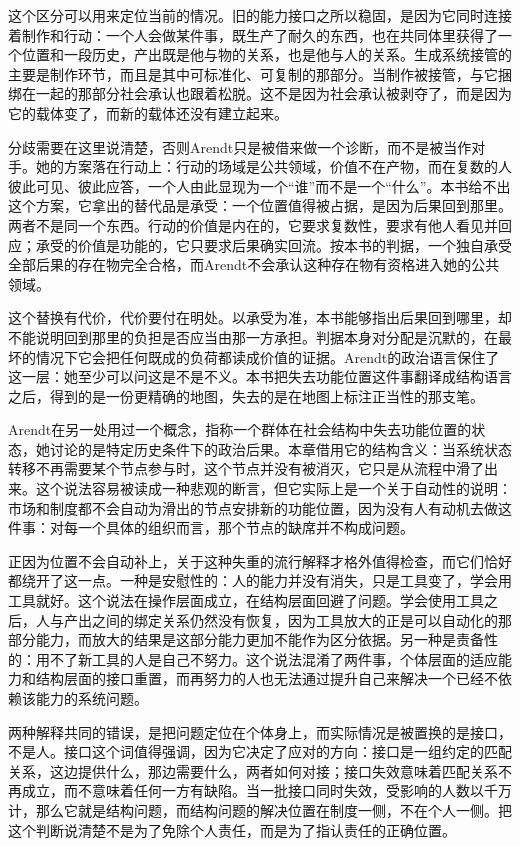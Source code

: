 这个区分可以用来定位当前的情况。旧的能力接口之所以稳固，是因为它同时连接着制作和行动：一个人会做某件事，既生产了耐久的东西，也在共同体里获得了一个位置和一段历史，产出既是他与物的关系，也是他与人的关系。生成系统接管的主要是制作环节，而且是其中可标准化、可复制的那部分。当制作被接管，与它捆绑在一起的那部分社会承认也跟着松脱。这不是因为社会承认被剥夺了，而是因为它的载体变了，而新的载体还没有建立起来。

分歧需要在这里说清楚，否则Arendt只是被借来做一个诊断，而不是被当作对手。她的方案落在行动上：行动的场域是公共领域，价值不在产物，而在复数的人彼此可见、彼此应答，一个人由此显现为一个“谁”而不是一个“什么”\cite{arendt1958human}。本书给不出这个方案，它拿出的替代品是承受：一个位置值得被占据，是因为后果回到那里。两者不是同一个东西。行动的价值是内在的，它要求复数性，要求有他人看见并回应；承受的价值是功能的，它只要求后果确实回流。按本书的判据，一个独自承受全部后果的存在物完全合格，而Arendt不会承认这种存在物有资格进入她的公共领域。

这个替换有代价，代价要付在明处。以承受为准，本书能够指出后果回到哪里，却不能说明回到那里的负担是否应当由那一方承担。判据本身对分配是沉默的，在最坏的情况下它会把任何既成的负荷都读成价值的证据。Arendt的政治语言保住了这一层：她至少可以问这是不是不义。本书把失去功能位置这件事翻译成结构语言之后，得到的是一份更精确的地图，失去的是在地图上标注正当性的那支笔。

Arendt在另一处用过一个概念，指称一个群体在社会结构中失去功能位置的状态，她讨论的是特定历史条件下的政治后果。本章借用它的结构含义：当系统状态转移不再需要某个节点参与时，这个节点并没有被消灭，它只是从流程中滑了出来。这个说法容易被读成一种悲观的断言，但它实际上是一个关于自动性的说明：市场和制度都不会自动为滑出的节点安排新的功能位置，因为没有人有动机去做这件事：对每一个具体的组织而言，那个节点的缺席并不构成问题。


正因为位置不会自动补上，关于这种失重的流行解释才格外值得检查，而它们恰好都绕开了这一点。一种是安慰性的：人的能力并没有消失，只是工具变了，学会用工具就好。这个说法在操作层面成立，在结构层面回避了问题。学会使用工具之后，人与产出之间的绑定关系仍然没有恢复，因为工具放大的正是可以自动化的那部分能力，而放大的结果是这部分能力更加不能作为区分依据。另一种是责备性的：用不了新工具的人是自己不努力。这个说法混淆了两件事，个体层面的适应能力和结构层面的接口重置，而再努力的人也无法通过提升自己来解决一个已经不依赖该能力的系统问题。

两种解释共同的错误，是把问题定位在个体身上，而实际情况是被置换的是接口，不是人。接口这个词值得强调，因为它决定了应对的方向：接口是一组约定的匹配关系，这边提供什么，那边需要什么，两者如何对接；接口失效意味着匹配关系不再成立，而不意味着任何一方有缺陷。当一批接口同时失效，受影响的人数以千万计，那么它就是结构问题，而结构问题的解决位置在制度一侧，不在个人一侧。把这个判断说清楚不是为了免除个人责任，而是为了指认责任的正确位置。

